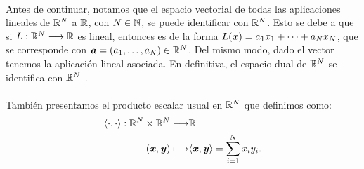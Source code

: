 \paragraph{}Antes de continuar, notamos que el espacio vectorial de todas las aplicaciones lineales de $ \mathbb{R}^N $ a $ \mathbb{R} $, con $ N \in \mathbb{N} $, se puede identificar con $ \mathbb{R}^N $. Esto se debe a que si $ L:\mathbb{R}^N \longrightarrow \mathbb{R} $ es lineal, entonces es de la forma $ L(\textbf{\emph{x}}) = a_1x_1 + \cdots + a_Nx_N $, que se corresponde con $ \textbf{\emph{a}} = (a_1,\dots,a_N) \in \mathbb{R}^N $. Del mismo modo, dado el vector tenemos la aplicación lineal asociada. En definitiva, el espacio dual de 
$ \mathbb{R}^N $ se identifica con $ \mathbb{R}^N $ .
\paragraph{} También presentamos el producto escalar usual en $ \mathbb{R}^N $ que definimos como:
\[
\begin{split}
\langle \cdot, \cdot \rangle : \mathbb{R}^N \times \mathbb{R}^N \longrightarrow &\mathbb{R} \\
(\textbf{\emph{x}}, \textbf{\emph{y}}) \longmapsto &\langle \textbf{\emph{x}}, \textbf{\emph{y}} \rangle = \sum_{i=1}^{N}x_iy_i.
\end{split}
\]


